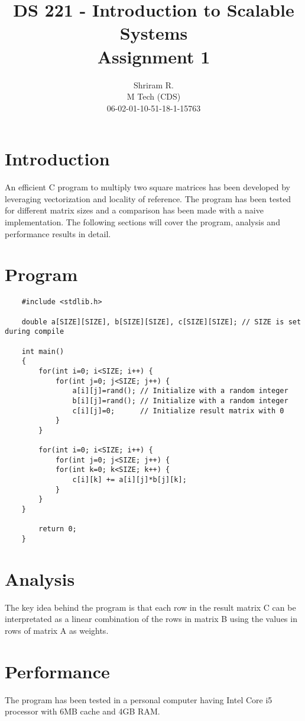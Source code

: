 \documentclass[11pt,a4paper,oneside]{article}
\begin{document}
	\title{DS 221 - Introduction to Scalable Systems \\ Assignment 1}
	\author{Shriram R. \\ M Tech (CDS) \\ 06-02-01-10-51-18-1-15763}
	\maketitle
	
	\section{Introduction}
	An efficient C program to multiply two square matrices has been developed by leveraging vectorization and locality of reference. The program has been tested for different matrix sizes and a comparison has been made with a naive implementation. The following sections will cover the program, analysis and performance results in detail.
	
	\section{Program}
	\begin{verbatim}
	#include <stdlib.h>
	
	double a[SIZE][SIZE], b[SIZE][SIZE], c[SIZE][SIZE]; // SIZE is set during compile
	
	int main()
	{
	    for(int i=0; i<SIZE; i++) {
	        for(int j=0; j<SIZE; j++) {
	            a[i][j]=rand(); // Initialize with a random integer
	            b[i][j]=rand(); // Initialize with a random integer
	            c[i][j]=0;      // Initialize result matrix with 0
	        }
	    }
	
	    for(int i=0; i<SIZE; i++) {
	        for(int j=0; j<SIZE; j++) {
            for(int k=0; k<SIZE; k++) {
                c[i][k] += a[i][j]*b[j][k];
            }
        }
    }
        	
	    return 0;
	}
	\end{verbatim}
	
    \section{Analysis}
    The key idea behind the program is that each row in the result matrix C can be interpretated as a linear combination of the rows in matrix B using the values in rows of matrix A as weights.
    
    \section{Performance}
    The program has been tested in a personal computer having Intel Core i5 processor with 6MB cache and 4GB RAM.
\end{document}
